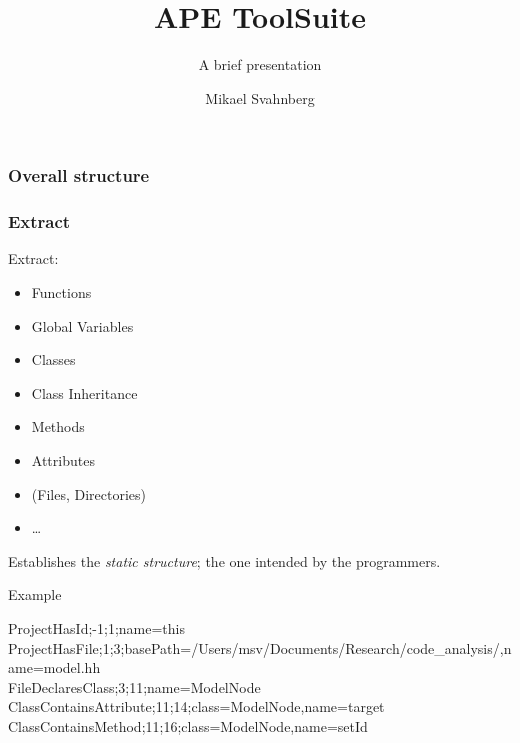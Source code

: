 \documentclass[10pt]{beamer}
\title[]{APE ToolSuite}
\subtitle{A brief presentation}
\author[Mikael Svahnberg]{Mikael Svahnberg\inst{1}}
\institute[BTH] %
{
  \inst{1}%
 Mikael.Svahnberg@bth.se\\
 School of Computing\\
 Blekinge Institute of Technology%
}
\begin{document}
\begin{frame}
  \titlepage
\end{frame}



\begin{frame}[t]
\frametitle{Overall structure}


\end{frame}

\begin{frame}[t]
\frametitle{Extract}

Extract:
\begin{itemize}
\item Functions
\item Global Variables
\item Classes
\item Class Inheritance
\item Methods
\item Attributes
\item (Files, Directories)
\item \ldots
\end{itemize}

Establishes the \emph{static structure}; the one intended by the programmers.

\begin{exampleblock}{Example}
\begin{scriptsize}
ProjectHasId;-1;1;name=this\\
ProjectHasFile;1;3;basePath=/Users/msv/Documents/Research/code\_analysis/,name=model.hh\\
FileDeclaresClass;3;11;name=ModelNode\\
ClassContainsAttribute;11;14;class=ModelNode,name=target\\
ClassContainsMethod;11;16;class=ModelNode,name=setId\\
\end{scriptsize}
\end{exampleblock}

\end{frame}
\end{document}
